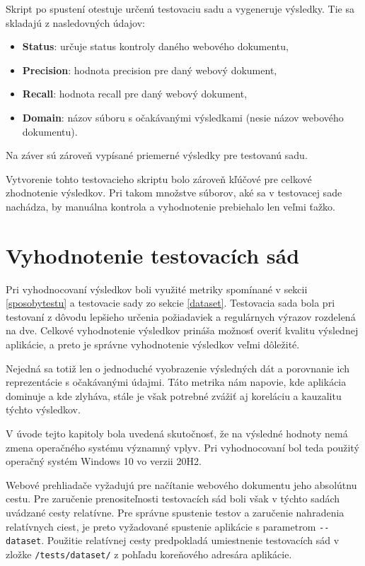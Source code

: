 \bigskip

Skript po spustení otestuje určenú testovaciu sadu a vygeneruje výsledky. Tie sa skladajú z nasledovných údajov:

\begin{itemize}
    \item \textbf{Status}: určuje status kontroly daného webového dokumentu,
    \item \textbf{Precision}: hodnota precision pre daný webový dokument,
    \item \textbf{Recall}: hodnota recall pre daný webový dokument,
    \item \textbf{Domain}: názov súboru s očakávanými výsledkami (nesie názov webového dokumentu).
\end{itemize}

\bigskip

Na záver sú zároveň vypísané priemerné výsledky pre testovanú sadu.

\bigskip

Vytvorenie tohto testovacieho skriptu bolo zároveň kľúčové pre celkové zhodnotenie výsledkov. Pri takom množstve súborov, aké sa v testovacej sade nachádza, by manuálna kontrola a vyhodnotenie prebiehalo len veľmi ťažko.

\newpage

\section{Vyhodnotenie testovacích sád}

Pri vyhodnocovaní výsledkov boli využité metriky spomínané v sekcii \ref{sposobytestu} a testovacie sady zo sekcie \ref{dataset}. Testovacia sada  bola pri testovaní z dôvodu lepšieho určenia požiadaviek a regulárnych výrazov rozdelená na dve. Celkové vyhodnotenie výsledkov prináša možnosť overiť kvalitu výslednej aplikácie, a preto je správne vyhodnotenie výsledkov veľmi dôležité. 

Nejedná sa totiž len o jednoduché vyobrazenie výsledných dát a porovnanie ich reprezentácie s očakávanými údajmi. Táto metrika nám napovie, kde aplikácia dominuje a kde zlyháva, stále je však potrebné zvážiť aj koreláciu a kauzalitu týchto výsledkov. 

V úvode tejto kapitoly bola uvedená skutočnosť, že na výsledné hodnoty nemá zmena operačného systému významný vplyv. Pri vyhodnocovaní bol teda použitý operačný systém Windows 10 vo verzii 20H2.

Webové prehliadače vyžadujú pre načítanie webového dokumentu jeho absolútnu cestu. Pre zaručenie prenositeľnosti testovacích sád boli však v  týchto sadách uvádzané cesty relatívne. Pre správne spustenie testov a zaručenie nahradenia relatívnych ciest, je preto vyžadované spustenie aplikácie s parametrom \texttt{-{}-dataset}. Použitie relatívnej cesty predpokladá umiestnenie testovacích sád v zložke \texttt{/tests/dataset/} z pohľadu koreňového adresára aplikácie.

